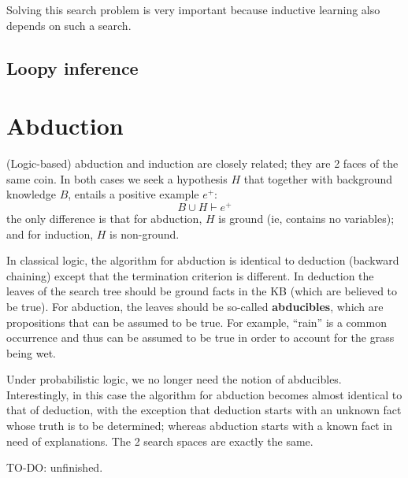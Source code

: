 \documentclass[a4paper]{report}
\begin{document}
Solving this search problem is very important because inductive learning also depends on such a search.

\subsection{Loopy inference}

\section{Abduction}
\label{sec:abduction}

(Logic-based) abduction and induction are closely related;  they are 2 faces of the same coin.  In both cases we seek a hypothesis $H$ that together with background knowledge $B$, entails a positive example $e^+$:
$$ B \cup H \vdash e^+ $$
the only difference is that for abduction, $H$ is ground (ie, contains no variables); and for induction, $H$ is non-ground.

In classical logic, the algorithm for abduction is identical to deduction (backward chaining) except that the termination criterion is different.  In deduction the leaves of the search tree should be ground facts in the KB (which are believed to be true).  For abduction, the leaves should be so-called \textbf{abducibles}, which are propositions that can be assumed to be true.  For example, ``rain'' is a common occurrence and thus can be assumed to be true in order to account for the grass being wet.

Under probabilistic logic, we no longer need the notion of abducibles.  Interestingly, in this case the algorithm for abduction becomes almost identical to that of deduction, with the exception that deduction starts with an unknown fact whose truth is to be determined; whereas abduction starts with a known fact in need of explanations.  The 2 search spaces are exactly the same.

TO-DO:  unfinished.

%
%
\end{document}
